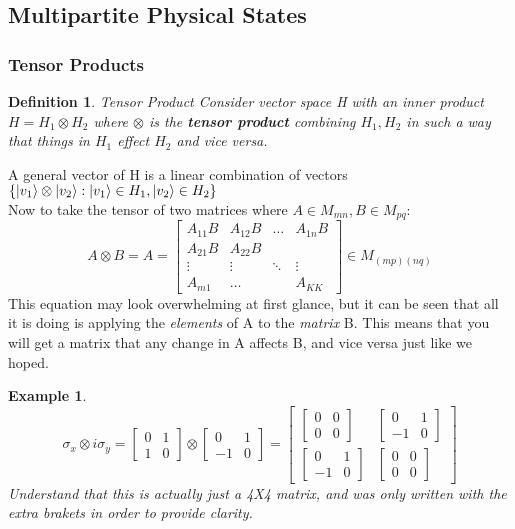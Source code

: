 \documentclass[12pt]{article}
\theoremstyle{plain}
\theoremstyle{nonumberplain}
\theoremstyle{plain}
\newtheorem{definition}[lemma]{Definition}
\newtheorem{example}[lemma]{Example}
\theoremstyle{nonumberplain}
\newcommand\1{{\bf 1}}
\newcommand{\bmat}[1]{\begin{bmatrix*} #1 \end{bmatrix*}} %
\newcommand{\<}{\left\langle}
\renewcommand{\>}{\right\rangle}
\begin{document}
\pagebreak

\subsection{Multipartite Physical States}
\subsubsection{Tensor Products}
\begin{definition}{Tensor Product}
Consider vector space H with an inner product $H = H_1 \otimes H_2$ where $\otimes$ is the \textbf{tensor product} combining $H_1, H_2$ in such a way that things in $H_1$ effect $H_2$ and vice versa.  
\end{definition}
A general vector of H is a linear combination of vectors $\{\ket{v_1}\otimes\ket{v_2}:\ket{v_1}\in H_1, \ket{v_2}\in H_2\}$\\

Now to take the tensor of two matrices where $A\in M_{mn}, B\in M_{pq}$:\\
\begin{equation}
A \otimes B = A = \begin{bmatrix} 
    			A_{11}B & A_{12}B & \dots & A_{1n}B \\
    			A_{21}B & A_{22}B &       &         \\
    			\vdots  & \vdots & \ddots & \vdots  \\
    			A_{m1}  &  \dots &      & A_{KK} 
    			\end{bmatrix} \in M_{(mp)(nq)}
\end{equation}
This equation may look overwhelming at first glance, but it can be seen that all it is doing is applying the \textit{elements} of A to the \textit{matrix} B.  This means that you will get a matrix that any change in A affects B, and vice versa just like we hoped.  \\

\begin{example}
\begin{equation}
\sigma_x \otimes i\sigma_y = \bmat{0 &1\\ 1 &0} \otimes \bmat{0 &1\\ -1 &0} = \bmat{\bmat{0 &0\\ 0 &0} &\bmat{0 &1\\ -1 &0}\\ \bmat{0 &1\\ -1 &0} &\bmat{0 &0\\ 0 &0}}
\end{equation}
\textit{Understand that this is actually just a 4X4 matrix, and was only written with the extra brakets in order to provide clarity.}
\end{example}
\end{document}
